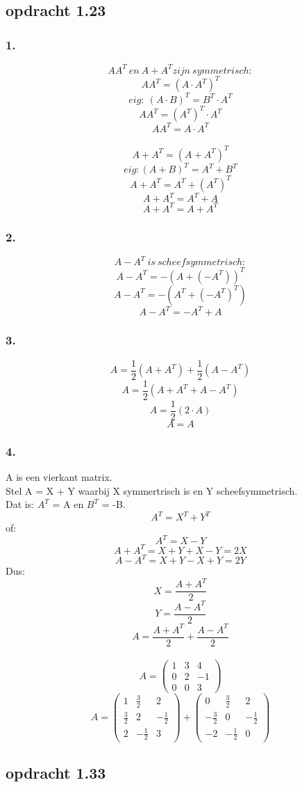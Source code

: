 \documentclass[10pt,a4paper]{article}
\begin{document}
\subsection*{opdracht 1.23}
\subsubsection*{1.}
\[
AA^T \ en \ A + A^T zijn \ symmetrisch:
\]
\[
AA^T = (A\cdot A^T)^T
\]
$$eig: \ (A\cdot B)^T = B^T \cdot A^T $$
$$AA^T = (A^T)^T \cdot A^T$$
$$AA^T = A \cdot A^T$$
\\
$$A +A^T = (A +A^T)^T$$
$$eig: (A+B)^T = A^T + B^T$$
$$A +A^T = A^T + (A^T)^T$$
$$A +A^T = A^T + A$$
$$A +A^T = A + A^T$$
\subsubsection*{2.}
$$A - A^T \ is \ scheefsymmetrisch:$$
$$A - A^T = -(A+(-A^T))^T$$
$$A - A^T = -(A^T + (-A^T)^T)$$
$$A - A^T = -A^T + A$$
\subsubsection*{3.}
$$ A =  \frac{1}{2}(A + A^T) + \frac{1}{2}(A - A^T)$$
$$ A = \frac{1}{2}(A + A^T + A - A^T)$$
$$ A = \frac{1}{2}(2\cdot A)$$
$$ A = A$$
\subsubsection*{4.}
A is een vierkant matrix.\\
Stel A = X + Y waarbij X symmertrisch is en Y scheefsymmetrisch.\\
Dat is: $A^T$ = A en $B^T$ = -B.\\
$$A^T = X^T + Y^T$$
of: $$A^T = X - Y$$
$$A + A^T = X + Y + X - Y = 2X$$
$$A - A^T = X + Y - X + Y = 2Y$$
Dus:
$$X = \frac{A + A^T}{2}$$
$$Y = \frac{A - A^T}{2}$$
$$A = \frac{A + A^T}{2} + \frac{A - A^T}{2}$$
\\
$$
A = \begin{pmatrix}
1 & 3 & 4\\
0 & 2 & -1\\
0 & 0 & 3
\end{pmatrix}
$$
$$
A = \begin{pmatrix}
1 & \frac{3}{2} & 2\\
\frac{3}{2} & 2 & -\frac{1}{2}\\
2 & -\frac{1}{2} & 3
\end{pmatrix}
+
\begin{pmatrix}
0 & \frac{3}{2} & 2\\
-\frac{3}{2} & 0 & -\frac{1}{2}\\
-2 & -\frac{1}{2} & 0
\end{pmatrix}
$$
\subsection*{opdracht 1.33}
\end{document}
